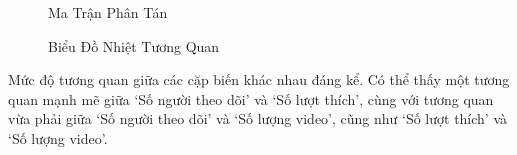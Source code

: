 \vspace*{-4pt}
\begin{figure}[ht]
    \centering
    \caption{Ma Trận Phân Tán}
    \label{fig:ma_tran_phan_tan}
\end{figure}

\begin{figure}[H]
    \centering
    \caption{Biểu Đồ Nhiệt Tương Quan}
    \label{fig:bieu_do_nhiet_tuong_quan}
\end{figure}

Mức độ tương quan giữa các cặp biến khác nhau đáng kể. Có thể thấy một tương quan mạnh mẽ giữa `Số người theo dõi' và `Số lượt thích', cùng với tương quan vừa phải giữa `Số người theo dõi' và `Số lượng video', cũng như `Số lượt thích' và `Số lượng video'.

